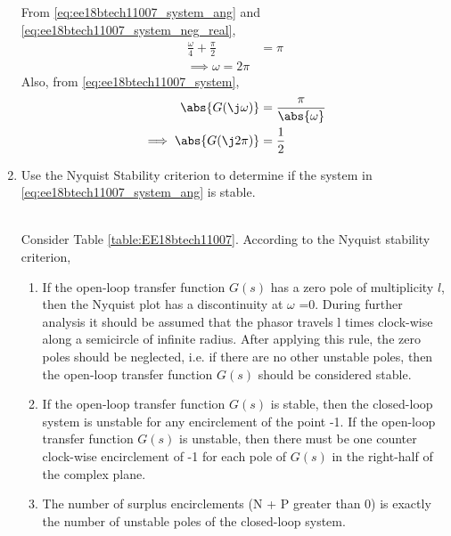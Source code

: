 \begin{enumerate}[label=\thesubsection.\arabic*.,ref=\thesubsection.\theenumi]
From \eqref{eq:ee18btech11007_system_ang} and \eqref{eq:ee18btech11007_system_neg_real}, 
\begin{align}
\frac{\omega}{4}+\frac{\pi}{2} &= \pi
\\
\implies \omega = 2\pi
\end{align}
Also, from \eqref{eq:ee18btech11007_system},
\begin{align}
\label{eq:ee18btech11007_system_mod}
\abs{ G(\j\omega)}&=\frac{\pi }{\abs{\omega}}
\\
\implies \abs{ G(\j2\pi)} &= \frac{1}{2}
\end{align}
%

%
\item Use the Nyquist Stability criterion to determine if the system in \eqref{eq:ee18btech11007_system_ang} is stable.
\begin{table}[!ht]
\centering

\caption{}
\label{table:EE18btech11007}
\end{table}
\\
\solution Consider Table \ref{table:EE18btech11007}.  According to the Nyquist stability criterion, 
\begin{enumerate}
\item If the open-loop transfer function $G(s)$ has a zero pole of multiplicity $l$, then the Nyquist plot has a discontinuity at $\omega$ =0. During further analysis it should be assumed that the phasor travels l times clock-wise along a semicircle of infinite radius. After applying this rule, the zero poles should be neglected, i.e. if there are no other unstable poles, then the open-loop transfer function $G(s)$ should be considered stable.
\item If the open-loop transfer function $G(s)$ is stable, then the closed-loop system is unstable for any encirclement of the point -1.
If the open-loop transfer function $G(s)$ is unstable, then there must be one counter clock-wise encirclement of -1 for each pole of $G(s)$ in the right-half of the complex plane.
\label{them:ee18btech11007_nyquist3}
\item The number of surplus encirclements (N + P greater than 0) is exactly the number of unstable poles of the closed-loop system.

\end{enumerate}
\end{enumerate}

